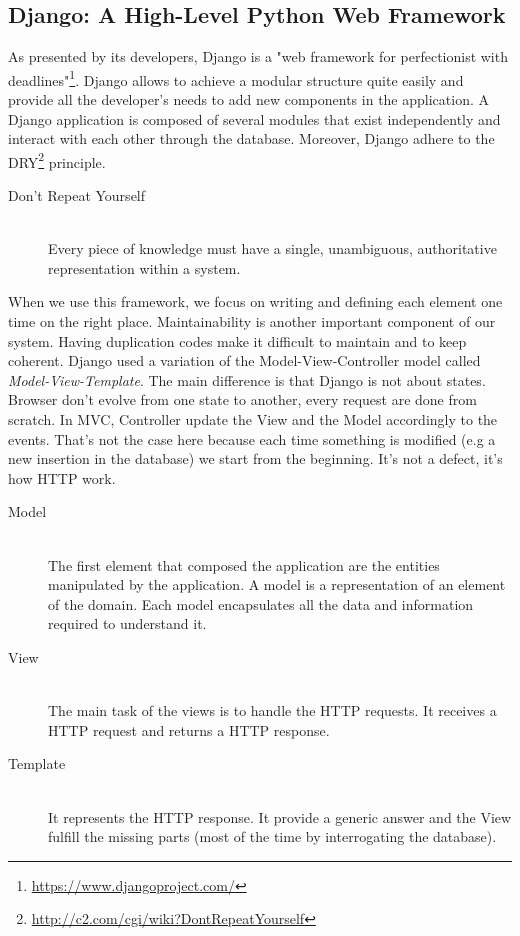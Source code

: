 \subsection{Django: A High-Level Python Web Framework}
As presented by its developers, Django is a "web framework for perfectionist with deadlines"\footnote{\url{https://www.djangoproject.com/}}. Django allows to achieve a modular structure quite easily and provide all the developer's needs to add new components in the application. A Django application is composed of several modules that exist independently and interact with each other through the database.
Moreover, Django adhere to the DRY\footnote{\url{http://c2.com/cgi/wiki?DontRepeatYourself}} principle.
\begin{description}
  \item[Don't Repeat Yourself] \hfill \\
  Every piece of knowledge must have a single, unambiguous, authoritative representation within a system.
\end{description}
When we use this framework, we focus on writing and defining each element one time on the right place. Maintainability is another important component of our system. Having duplication codes make it difficult to maintain and to keep coherent.
Django used a variation of the Model-View-Controller model called \emph{Model-View-Template}\cite{mvt}. The main difference is that Django is not about states. Browser don't evolve from one state to another, every request are done from scratch. In MVC, Controller update the View and the Model accordingly to the events. That's not the case here because each time something is modified (e.g a new insertion in the database) we start from the beginning. It's not a defect, it's how HTTP work.

\begin{description}
\item[Model] \hfill \\
The first element that composed the application are the entities manipulated by the application. A model is a representation of an element of the domain. Each model encapsulates all the data and information required to understand it.
\item[View] \hfill \\
The main task of the views is to handle the HTTP requests. It receives a HTTP request and returns a HTTP response.
\item[Template] \hfill \\
It represents the HTTP response. It provide a generic answer and the View fulfill the missing parts (most of the time by interrogating the database).
\end{description}

